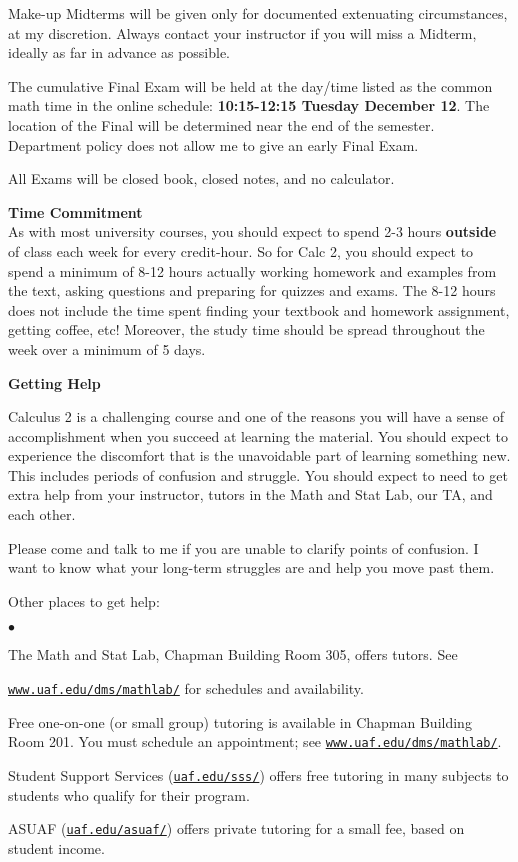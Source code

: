 \documentclass[12pt]{article}
\renewcommand{\emph}[1]{\textsf{\textbf{#1}}}
\newcommand{\localhead}[1]{\par\smallskip\textbf{#1} \smallskip\nobreak\\}%
\def\heading#1{\localhead{\large\emph{#1}}}
\newenvironment{clist}%
{\bgroup\parskip 0pt\begin{list}{$\bullet$}{\partopsep 4pt\topsep 0pt\itemsep -2pt}}%
{\end{list}\egroup}%
\begin{document}
Make-up Midterms will be given only for documented extenuating circumstances, at my discretion. Always contact your instructor if you will miss a Midterm, ideally as far in advance as possible.

The cumulative Final Exam will be held at the day/time listed as the common math time in the online schedule: \textbf{10:15-12:15 Tuesday December 12}.  The location of the Final will be determined near the end of the semester. Department policy does not allow me to give an early Final Exam.

All Exams will be closed book, closed notes, and no calculator.

\heading{Time Commitment}

\vspace*{-.3in}
As with most university courses, you should expect to spend 2-3 hours \emph{outside} of class each week for every credit-hour. So for Calc 2, you should expect to spend a minimum of 8-12 hours actually working homework and examples from the text, asking questions and preparing for quizzes and exams. The 8-12 hours does not include the time spent finding your textbook and homework assignment, getting coffee, etc! Moreover, the study time should be spread throughout the week over a minimum of 5 days.

\newpage
\heading{Getting Help}
\vspace*{-.3in}

Calculus 2 is a challenging course and one of the reasons you will have a sense of accomplishment when you succeed at learning the material. You should expect to experience the discomfort that is the unavoidable part of learning something new. This includes periods of confusion and struggle. You should expect to need to get extra help from your instructor, tutors in the Math and Stat Lab, our TA, and each other. 

Please come and talk to me if you are unable to clarify points of confusion. I want to know what your long-term struggles are and help you move past them.

Other places to get help: 

\begin{clist}
    	\item The Math and Stat Lab, Chapman Building Room 305, offers tutors. 
	See 

	\href{http://www.uaf.edu/dms/mathlab/}{\texttt{www.uaf.edu/dms/mathlab/}} for schedules and availability.
	\item Free
one-on-one (or small group) tutoring is available in 
Chapman Building Room 201. You must schedule an
appointment; see \href{http://www.uaf.edu/dms/mathlab/}{\texttt{www.uaf.edu/dms/mathlab/}}.
	\item Student Support Services (\href{https://uaf.edu/sss/}{\texttt{uaf.edu/sss/}}) offers free tutoring in many subjects to students who qualify for their program.
	\item ASUAF (\href{https://uaf.edu/asuaf/}{\texttt{uaf.edu/asuaf/}}) offers private tutoring for a small fee, based on student income.
\end{clist}
\end{document}
